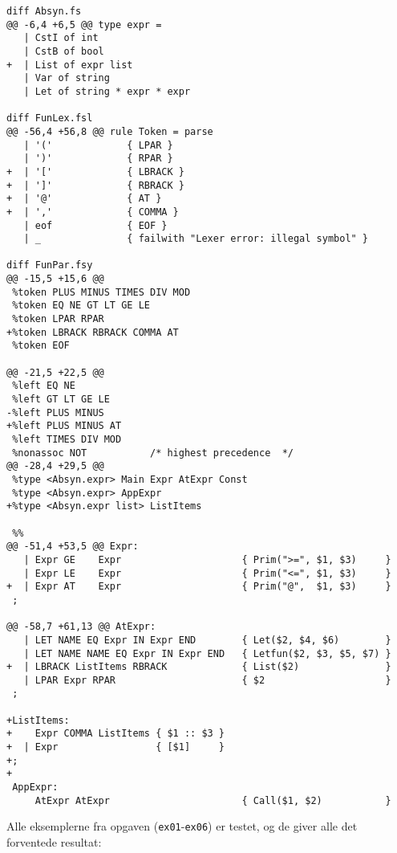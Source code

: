 \begin{verbatim}
diff Absyn.fs
@@ -6,4 +6,5 @@ type expr =
   | CstI of int
   | CstB of bool
+  | List of expr list
   | Var of string
   | Let of string * expr * expr

diff FunLex.fsl
@@ -56,4 +56,8 @@ rule Token = parse
   | '('             { LPAR }
   | ')'             { RPAR }
+  | '['             { LBRACK }
+  | ']'             { RBRACK }
+  | '@'             { AT }
+  | ','             { COMMA }
   | eof             { EOF }
   | _               { failwith "Lexer error: illegal symbol" }

diff FunPar.fsy
@@ -15,5 +15,6 @@
 %token PLUS MINUS TIMES DIV MOD
 %token EQ NE GT LT GE LE
 %token LPAR RPAR
+%token LBRACK RBRACK COMMA AT
 %token EOF
 
@@ -21,5 +22,5 @@
 %left EQ NE 
 %left GT LT GE LE
-%left PLUS MINUS
+%left PLUS MINUS AT
 %left TIMES DIV MOD 
 %nonassoc NOT           /* highest precedence  */
@@ -28,4 +29,5 @@
 %type <Absyn.expr> Main Expr AtExpr Const
 %type <Absyn.expr> AppExpr
+%type <Absyn.expr list> ListItems
 
 %%
@@ -51,4 +53,5 @@ Expr:
   | Expr GE    Expr                     { Prim(">=", $1, $3)     }
   | Expr LE    Expr                     { Prim("<=", $1, $3)     }
+  | Expr AT    Expr                     { Prim("@",  $1, $3)     }
 ;
 
@@ -58,7 +61,13 @@ AtExpr:
   | LET NAME EQ Expr IN Expr END        { Let($2, $4, $6)        }
   | LET NAME NAME EQ Expr IN Expr END   { Letfun($2, $3, $5, $7) }
+  | LBRACK ListItems RBRACK             { List($2)               }
   | LPAR Expr RPAR                      { $2                     }
 ;
 
+ListItems:
+    Expr COMMA ListItems { $1 :: $3 }
+  | Expr                 { [$1]     }
+;
+
 AppExpr:
     AtExpr AtExpr                       { Call($1, $2)           }
\end{verbatim}

Alle eksemplerne fra opgaven (\texttt{ex01}-\texttt{ex06}) er testet, og de giver alle det forventede resultat:

